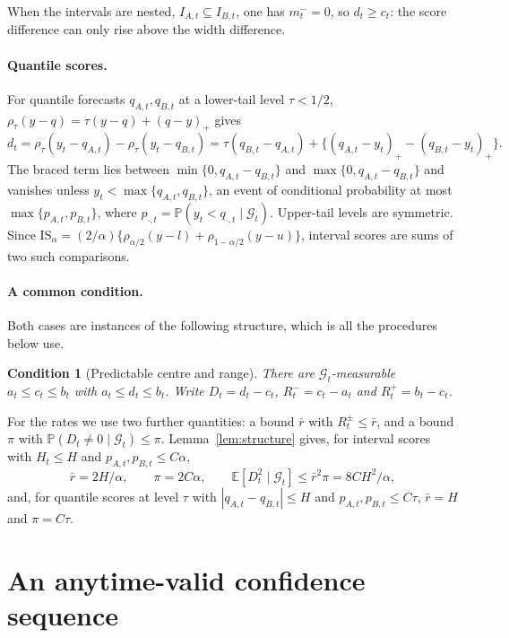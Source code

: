 \documentclass[11pt]{article}
\newtheorem{condition}{Condition}
\theoremstyle{remark}
\theoremstyle{definition}
\newcommand{\E}{\mathbb{E}}
\renewcommand{\Pr}{\mathbb{P}}
\newcommand{\G}{\mathcal{G}}
\newcommand{\IS}{\mathrm{IS}}
\newcommand{\rbar}{\bar r}
\begin{document}
When the intervals are nested, $I_{A,t}\subseteq I_{B,t}$, one has
$m_t^-=0$, so $d_t\ge c_t$: the score difference can only rise above the
width difference.

\paragraph{Quantile scores.}
For quantile forecasts $q_{A,t},q_{B,t}$ at a lower-tail level
$\tau<1/2$, $\rho_\tau(y-q)=\tau(y-q)+(q-y)_+$ gives
\begin{equation}
 d_t=\rho_\tau(y_t-q_{A,t})-\rho_\tau(y_t-q_{B,t})
 =\tau(q_{B,t}-q_{A,t})+\{(q_{A,t}-y_t)_+-(q_{B,t}-y_t)_+\}.
 \label{eq:quantile}
\end{equation}
The braced term lies between $\min\{0,q_{A,t}-q_{B,t}\}$ and
$\max\{0,q_{A,t}-q_{B,t}\}$ and vanishes unless
$y_t<\max\{q_{A,t},q_{B,t}\}$, an event of conditional probability at most
$\max\{p_{A,t},p_{B,t}\}$, where $p_{\cdot,t}=\Pr(y_t<q_{\cdot,t}\mid\G_t)$.
Upper-tail levels are symmetric. Since
$\IS_\alpha=(2/\alpha)\{\rho_{\alpha/2}(y-l)+\rho_{1-\alpha/2}(y-u)\}$,
interval scores are sums of two such comparisons.

\paragraph{A common condition.}
Both cases are instances of the following structure, which is all the
procedures below use.

\begin{condition}[Predictable centre and range]
\label{cond:range}
There are $\G_t$-measurable $a_t\le c_t\le b_t$ with $a_t\le d_t\le b_t$.
Write $D_t=d_t-c_t$, $R^-_t=c_t-a_t$ and $R^+_t=b_t-c_t$.
\end{condition}

For the rates we use two further quantities: a bound $\rbar$ with
$R_t^\pm\le\rbar$, and a bound $\pi$ with $\Pr(D_t\neq0\mid\G_t)\le\pi$.
Lemma~\ref{lem:structure} gives, for interval scores with $H_t\le H$ and
$p_{A,t},p_{B,t}\le C\alpha$,
\begin{equation}
 \rbar=2H/\alpha,\qquad \pi=2C\alpha,\qquad
 \E[D_t^2\mid\G_t]\le\rbar^2\pi=8CH^2/\alpha ,
 \label{eq:interval-constants}
\end{equation}
and, for quantile scores at level $\tau$ with
$|q_{A,t}-q_{B,t}|\le H$ and $p_{A,t},p_{B,t}\le C\tau$, $\rbar=H$ and
$\pi=C\tau$.

\section{An anytime-valid confidence sequence}
\label{sec:cs}
\end{document}
